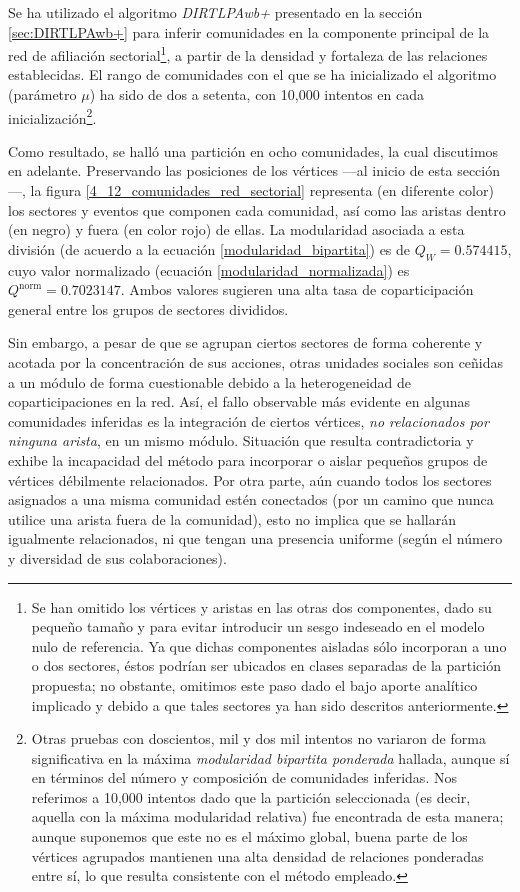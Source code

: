 \documentclass[letterpaper, 11pt]{book}
\theoremstyle{definition}
\theoremstyle{remark}
\begin{document}
Se ha utilizado el algoritmo \emph{DIRTLPAwb+} presentado en la sección \ref{sec:DIRTLPAwb+} para inferir comunidades en la componente principal de la red de afiliación sectorial\footnote{
    Se han omitido los vértices y aristas en las otras dos componentes, dado su pequeño tamaño y para evitar introducir un sesgo indeseado en el modelo nulo de referencia. 
    Ya que dichas componentes aisladas sólo incorporan a uno o dos sectores, éstos podrían ser ubicados en clases separadas de la partición propuesta; no obstante, omitimos este paso dado el bajo aporte analítico implicado y debido a que tales sectores ya han sido descritos anteriormente. 
}, a partir de la densidad y fortaleza de las relaciones establecidas. 
El rango de comunidades con el que se ha inicializado el algoritmo (parámetro $\mu$) ha sido de dos a setenta, con 10,000 intentos en cada inicialización\footnote{
    Otras pruebas con doscientos, mil y dos mil intentos no variaron de forma significativa en la máxima \emph{modularidad bipartita ponderada} hallada, aunque sí en términos del número y composición de comunidades inferidas. 
    Nos referimos a 10,000 intentos dado que la partición seleccionada (es decir, aquella con la máxima modularidad relativa) fue encontrada de esta manera; aunque suponemos que este no es el máximo global, buena parte de los vértices agrupados mantienen una alta densidad de relaciones ponderadas entre sí, lo que resulta consistente con el método empleado. 
}. 

Como resultado, se halló una partición en ocho comunidades, la cual discutimos en adelante. 
Preservando las posiciones de los vértices ---al inicio de esta sección---, la figura \ref{4_12_comunidades_red_sectorial} representa (en diferente color) los sectores y eventos que componen cada comunidad, así como las aristas dentro (en negro) y fuera (en color rojo) de ellas. 
La modularidad asociada a esta división (de acuerdo a la ecuación \ref{modularidad_bipartita}) es de $Q_{W} = 0.574415$, cuyo valor normalizado (ecuación \ref{modularidad_normalizada}) es $Q^{\text{norm}} = 0.7023147$. 
Ambos valores sugieren una alta tasa de coparticipación general entre los grupos de sectores divididos. 



Sin embargo, a pesar de que se agrupan ciertos sectores de forma coherente y acotada por la concentración de sus acciones, otras unidades sociales son ceñidas a un módulo de forma cuestionable debido a la heterogeneidad de coparticipaciones en la red. 
Así, el fallo observable más evidente en algunas comunidades inferidas es la integración de ciertos vértices, \emph{no relacionados por ninguna arista}, en un mismo módulo. 
Situación que resulta contradictoria y exhibe la incapacidad del método para incorporar o aislar pequeños grupos de vértices débilmente relacionados. 
Por otra parte, aún cuando todos los sectores asignados a una misma comunidad estén conectados (por un camino que nunca utilice una arista fuera de la comunidad), esto no implica que se hallarán igualmente relacionados, ni que tengan una presencia uniforme (según el número y diversidad de sus colaboraciones). 
\end{document}
